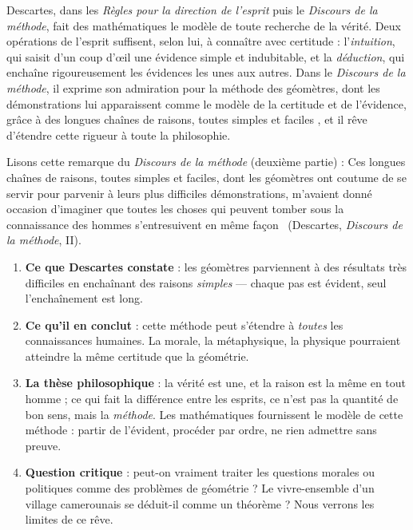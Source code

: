 \documentclass[11pt]{article}
\begin{document}
\begin{propriete}
Descartes, dans les \emph{Règles pour la direction de l'esprit} puis le \emph{Discours de la méthode}, fait des mathématiques le modèle de toute recherche de la vérité. Deux opérations de l'esprit suffisent, selon lui, à connaître avec certitude : l'\emph{intuition}, qui saisit d'un coup d'œil une évidence simple et indubitable, et la \emph{déduction}, qui enchaîne rigoureusement les évidences les unes aux autres. Dans le \emph{Discours de la méthode}, il exprime son admiration pour la méthode des géomètres, dont les démonstrations lui apparaissent comme le modèle de la certitude et de l'évidence, grâce à des \guillemotleft longues chaînes de raisons, toutes simples et faciles \guillemotright, et il rêve d'étendre cette rigueur à toute la philosophie.
\end{propriete}

\begin{experience}
Lisons cette remarque du \emph{Discours de la méthode} (deuxième partie) : \guillemotleft Ces longues chaînes de raisons, toutes simples et faciles, dont les géomètres ont coutume de se servir pour parvenir à leurs plus difficiles démonstrations, m'avaient donné occasion d'imaginer que toutes les choses qui peuvent tomber sous la connaissance des hommes s'entresuivent en même façon \guillemotright\ (Descartes, \emph{Discours de la méthode}, II).
\begin{enumerate}
\item \textbf{Ce que Descartes constate} : les géomètres parviennent à des résultats très difficiles en enchaînant des raisons \emph{simples} — chaque pas est évident, seul l'enchaînement est long.
\item \textbf{Ce qu'il en conclut} : cette méthode peut s'étendre à \emph{toutes} les connaissances humaines. La morale, la métaphysique, la physique pourraient atteindre la même certitude que la géométrie.
\item \textbf{La thèse philosophique} : la vérité est une, et la raison est la même en tout homme ; ce qui fait la différence entre les esprits, ce n'est pas la quantité de bon sens, mais la \emph{méthode}. Les mathématiques fournissent le modèle de cette méthode : partir de l'évident, procéder par ordre, ne rien admettre sans preuve.
\item \textbf{Question critique} : peut-on vraiment traiter les questions morales ou politiques comme des problèmes de géométrie ? Le vivre-ensemble d'un village camerounais se déduit-il comme un théorème ? Nous verrons les limites de ce rêve.
\end{enumerate}
\end{experience}
\end{document}
